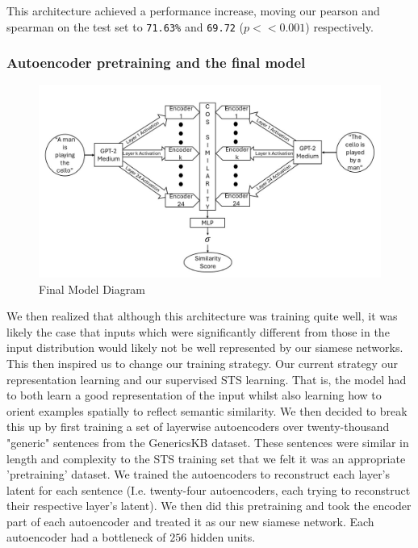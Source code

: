 \documentclass{article}
\begin{document}
This architecture achieved a  performance increase, moving our pearson and spearman on the test set to \verb|71.63%| and \verb|69.72| ($p << 0.001$) respectively.

\subsubsection{Autoencoder pretraining and the final model}
\begin{figure}
    \centering
    \includegraphics[width=1\linewidth]{model-diagram.jpg}
    \caption{Final Model Diagram}
    \label{fig:model-diagram}
\end{figure}

We then realized that although this architecture was training quite well, it was likely the case that inputs which were significantly different from those in the input distribution would likely not be well represented by our siamese networks. This then inspired us to change our training strategy. Our current strategy  our representation learning and our supervised STS learning. That is, the model had to both learn a good representation of the input whilst also learning how to orient examples spatially to reflect semantic similarity. We then decided to break this up by first training a set of layerwise autoencoders over twenty-thousand "generic" sentences from the GenericsKB \cite{bhakthavatsalam2020genericskbknowledgebasegeneric} dataset. These sentences were similar in length and complexity to the STS training set that we felt it was an appropriate 'pretraining' dataset. We trained the autoencoders to reconstruct each layer's latent for each sentence (I.e. twenty-four autoencoders, each trying to reconstruct their respective layer's latent). We then did this pretraining and took the encoder part of each autoencoder and treated it as our new siamese network. Each autoencoder had a bottleneck of $256$ hidden units.
\end{document}

